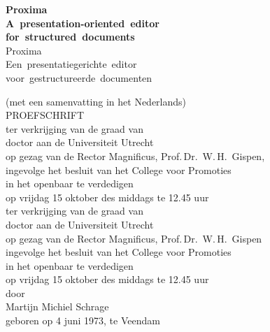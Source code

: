 \newcommand{\engtitle}{Proxima}
\newcommand{\engsubtitle}{A~presentation-oriented~editor\\
for~structured~documents}

\newcommand{\nltitle}{Proxima}
\newcommand{\nlsubtitle}{Een~presentatiegerichte~editor\\
voor~gestructureerde~documenten}

\thispagestyle{empty}

\parbox{141mm}{
\begin{center}
  {\sffamily\bfseries\Huge\engtitle\\
  \vspace{0.1cm}
  \huge\engsubtitle\\}
  \vspace{1cm}
  {\sffamily\huge\nltitle\\
  \vspace{0.1cm}
  \LARGE\nlsubtitle\\}
  
  \bc \vspace{4mm}
   (met een samenvatting in het Nederlands)  \\
  \vspace{1.9cm} \ec
  \vspace{2.2cm}%
  {\sffamily\Large PROEFSCHRIFT\\}
  \vspace{2.2cm}%
  \bc \vspace{1.8cm} \ec
  ter verkrijging van de graad van\\
  doctor aan de Universiteit Utrecht\\
  op gezag van de Rector Magnificus, Prof.\,Dr.~W.\,H.~Gispen,\\
  ingevolge het besluit van het College voor Promoties\\
  in het openbaar te verdedigen\\
  op vrijdag 15 oktober des middags te 12.45 uur\\
\bc
  ter verkrijging van de graad van\\
  doctor aan de Universiteit Utrecht\\
  op gezag van de Rector Magnificus, Prof.\,Dr.~W.\,H.~Gispen\\
  ingevolge het besluit van het College voor Promoties\\
  in het openbaar te verdedigen\\
  op vrijdag 15 oktober des middags te 12.45 uur\\ \ec
  \vspace{1.1cm} %
  door\\
  \vspace{1.1cm} %
  {\sffamily\Large Martijn Michiel Schrage\\}
  \vspace{1cm}
  geboren op 4 juni 1973, te Veendam
\end{center}
}

